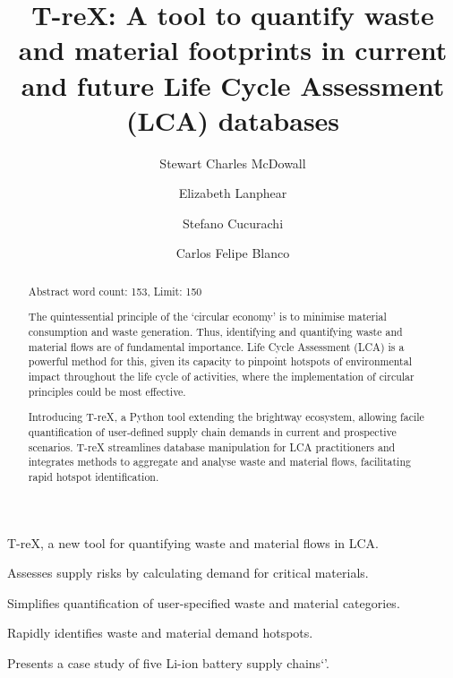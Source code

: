 \documentclass[review,3p,authoryear]{elsarticle}
\newcommand{\cbox}[1]{
    \begin{tcolorbox}[hbox, colback=red!5!white, colframe=red!65!black, boxrule=0.25pt, boxsep=2pt, left=2pt, right=2pt, top=1pt, bottom=1pt]
        \small\sffamily #1
    \end{tcolorbox}
}
\begin{document}
    \begin{highlights}
        \item T-reX, a new tool for quantifying waste and material flows in LCA.
        \item Assesses supply risks by calculating demand for critical materials.
        \item Simplifies quantification of user-specified waste and material categories.
        \item Rapidly identifies waste and material demand hotspots.
        \item Presents a case study of five Li-ion battery supply chains`'.
    \end{highlights}


\begin{frontmatter}

    \title{T-reX: A tool to quantify waste and material footprints in current and future Life Cycle Assessment (LCA) databases}
    \author[1]{Stewart Charles McDowall}
    \author[1]{Elizabeth Lanphear}
    \author[1]{Stefano Cucurachi}
    \author[1]{Carlos Felipe Blanco}



    \begin{abstract}
        \cbox{Abstract word count: 153, Limit: 150}
        The quintessential principle of the `circular economy' is to minimise material consumption and waste generation.
        Thus, identifying and quantifying waste and material flows are of fundamental importance. Life Cycle Assessment (LCA) is a powerful method for this, given its capacity to pinpoint hotspots of environmental impact throughout the life cycle of activities, where the implementation of circular principles could be most effective.

        Introducing T-reX, a Python tool extending the brightway ecosystem, allowing facile quantification of user-defined supply chain demands in current and prospective scenarios. T-reX streamlines database manipulation for LCA practitioners and integrates methods to aggregate and analyse waste and material flows, facilitating rapid hotspot identification.


\end{abstract}
\end{frontmatter}
\end{document}
